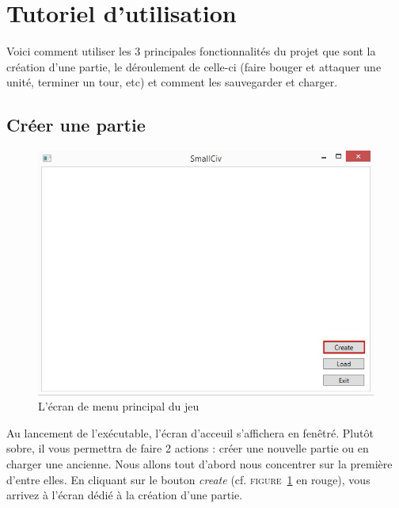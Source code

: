 \section{Tutoriel d'utilisation}
Voici comment utiliser les 3 principales fonctionnalités du projet que sont la création d'une partie, le déroulement de celle-ci (faire bouger et attaquer une unité, terminer un tour, etc) et comment les sauvegarder et charger. 

\subsection{Créer une partie}
\begin{figure}
	\centering
	\includegraphics{img/acceuil_to_creation.jpg}
	\caption{L'écran de menu principal du jeu}
	\label{start}
\end{figure}
Au lancement de l'exécutable, l'écran d'acceuil s'affichera en fenêtré. Plutôt sobre, il vous permettra de faire 2 actions : créer une nouvelle partie ou en charger une ancienne. Nous allons tout d'abord nous concentrer sur la première d'entre elles. En cliquant sur le bouton \emph{create} (cf. \textsc{figure~\ref{start}} en rouge), vous arrivez à l'écran dédié à la création d'une partie.\newline

